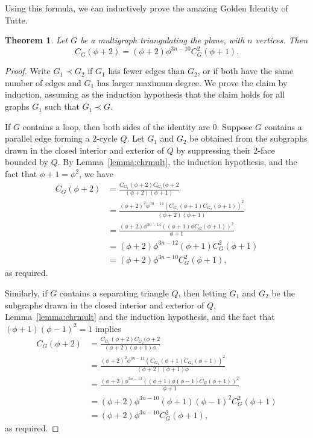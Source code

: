 \documentclass[12pt,twoside,openright,a4paper]{book}
\newtheorem{theorem}{Theorem}[chapter]
\begin{document}
Using this formula, we can inductively prove the amazing Golden Identity of Tutte.
\begin{theorem}\label{thm:golden}
Let $G$ be a multigraph triangulating the plane, with $n$ vertices.  Then
$$C_G(\phi+2)=(\phi+2)\phi^{3n-10}C^2_G(\phi+1).$$
\end{theorem}
\begin{proof}
Write $G_1\prec G_2$ if $G_1$ has fewer edges than $G_2$, or if both have the same number of edges and $G_1$ has larger
maximum degree.  We prove the claim by induction, assuming as the induction hypothesis that the claim holds for
all graphs $G_1$ such that $G_1\prec G$.

If $G$ contains a loop, then both sides of the identity are $0$.  Suppose $G$ contains a parallel edge forming a $2$-cycle $Q$.
Let $G_1$ and $G_2$ be obtained from the subgraphs drawn in the closed interior and exterior of $Q$ by suppressing their $2$-face bounded by $Q$.
By Lemma~\ref{lemma:chrmult}, the induction hypothesis, and the fact that $\phi+1=\phi^2$, we have
\begin{align*}
C_G(\phi+2)&=\frac{C_{G_1}(\phi+2)C_{G_2}(\phi+2}{(\phi+2)(\phi+1)}\\
&=\frac{(\phi+2)^2\phi^{3n-14}(C_{G_1}(\phi+1)C_{G_2}(\phi+1))^2}{(\phi+2)(\phi+1)}\\
&=\frac{(\phi+2)\phi^{3n-14}((\phi+1)\phi C_G(\phi+1))^2}{\phi+1}\\
&=(\phi+2)\phi^{3n-12}(\phi+1) C^2_G(\phi+1)\\
&=(\phi+2)\phi^{3n-10}C^2_G(\phi+1),
\end{align*}
as required.

Similarly, if $G$ contains a separating triangle $Q$, then letting $G_1$ and $G_2$ be the subgraphs
drawn in the closed interior and exterior of $Q$,
Lemma~\ref{lemma:chrmult} and the induction hypothesis, and the fact that $(\phi+1)(\phi-1)^2=1$ implies
\begin{align*}
C_G(\phi+2)&=\frac{C_{G_1}(\phi+2)C_{G_2}(\phi+2}{(\phi+2)(\phi+1)\phi}\\
&=\frac{(\phi+2)^2\phi^{3n-11}(C_{G_1}(\phi+1)C_{G_2}(\phi+1))^2}{(\phi+2)(\phi+1)\phi}\\
&=\frac{(\phi+2)\phi^{3n-12}((\phi+1)\phi(\phi-1) C_G(\phi+1))^2}{\phi+1}\\
&=(\phi+2)\phi^{3n-10}(\phi+1)(\phi-1)^2 C^2_G(\phi+1)\\
&=(\phi+2)\phi^{3n-10}C^2_G(\phi+1),
\end{align*}
as required.


\end{proof}
\end{document}
